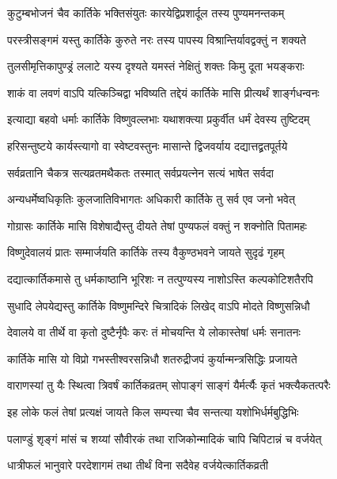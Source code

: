 \twolineshloka
{कुटुम्बभोजनं चैव कार्तिके भक्तिसंयुतः}
{कारयेद्विप्रशार्दूल तस्य पुण्यमनन्तकम्} %

\twolineshloka
{परस्त्रीसङ्गमं यस्तु कार्तिके कुरुते नरः}
{तस्य पापस्य विश्रान्तिर्यावद्वक्तुं न शक्यते} %

\twolineshloka
{तुलसीमृत्तिकापुण्ड्रं ललाटे यस्य दृश्यते}
{यमस्तं नेक्षितुं शक्तः किमु दूता भयङ्कराः} %

\twolineshloka
{शाकं वा लवणं वाऽपि यत्किञ्चिद्वा भविष्यति}
{तद्देयं कार्तिके मासि प्रीत्यर्थं शार्ङ्गधन्वनः} %

\twolineshloka
{इत्याद्या बहवो धर्माः कार्तिके विष्णुवल्लभाः}
{यथाशक्त्या प्रकुर्वीत धर्मं देवस्य तुष्टिदम्} %

\twolineshloka
{हरिसन्तुष्टये कार्यस्त्यागो वा स्वेष्टवस्तुनः}
{मासान्ते द्विजवर्याय दद्यात्तद्व्रतपूर्तये} %

\twolineshloka
{सर्वव्रतानि चैकत्र सत्यव्रतमथैकतः}
{तस्मात् सर्वप्रयत्नेन सत्यं भाषेत सर्वदा} %

\twolineshloka
{अन्यधर्मेष्वधिकृतिः कुलजातिविभागतः}
{अधिकारी कार्तिके तु सर्व एव जनो भवेत्} %

\twolineshloka
{गोग्रासः कार्तिके मासि विशेषाद्यैस्तु दीयते}
{तेषां पुण्यफलं वक्तुं न शक्नोति पितामहः} %

\twolineshloka
{विष्णुदेवालयं प्रातः सम्मार्जयति कार्तिके}
{तस्य वैकुण्ठभवने जायते सुदृढं गृहम्} %

\twolineshloka
{दद्यात्कार्तिकमासे तु धर्मकाष्ठानि भूरिशः}
{न तत्पुण्यस्य नाशोऽस्ति कल्पकोटिशतैरपि} %

\twolineshloka
{सुधादि लेपयेद्यस्तु कार्तिके विष्णुमन्दिरे}
{चित्रादिकं लिखेद् वाऽपि मोदते विष्णुसन्निधौ} %

\twolineshloka
{देवालये वा तीर्थे वा कृतो दुष्टैर्नृपैः करः}
{तं मोचयन्ति ये लोकास्तेषां धर्मः सनातनः} %

\twolineshloka
{कार्तिके मासि यो विप्रो गभस्तीश्वरसन्निधौ}
{शतरुद्रीजपं कुर्यान्मन्त्रसिद्धिः प्रजायते} %

\twolineshloka
{वाराणस्यां तु यैः स्थित्वा त्रिवर्षं कार्तिकव्रतम्}
{सोपाङ्गं साङ्गं यैर्मर्त्यैः कृतं भक्त्यैकतत्परैः} %

\twolineshloka
{इह लोके फलं तेषां प्रत्यक्षं जायते किल}
{सम्पत्त्या चैव सन्तत्या यशोभिर्धर्मबुद्धिभिः} %

\twolineshloka
{पलाण्डुं शृङ्गं मांसं च शय्यां सौवीरकं तथा}
{राजिकोन्मादिकं चापि चिपिटान्नं च वर्जयेत्} %

\twolineshloka
{धात्रीफलं भानुवारे परदेशागमं तथा}
{तीर्थं विना सदैवेह वर्जयेत्कार्तिकव्रती} %

